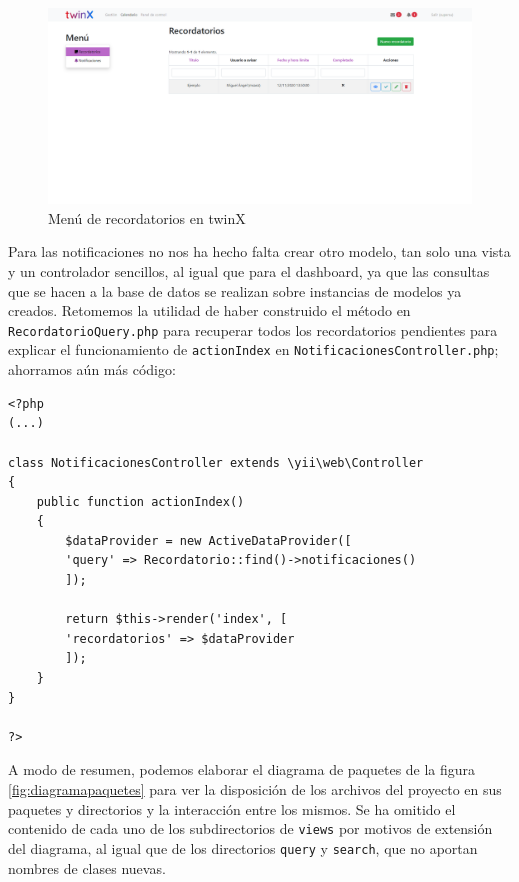 \begin{figure}
	\centering
	\includegraphics[width=\linewidth]{img/Capturas de twinX/recordatorios}
	\caption{Menú de recordatorios en twinX}
	\label{fig:recordatoriostwinX}
\end{figure}

Para las notificaciones no nos ha hecho falta crear otro modelo, tan solo una vista y un controlador sencillos, al igual que para el dashboard, ya que las consultas que se hacen a la base de datos se realizan sobre instancias de modelos ya creados. Retomemos la utilidad de haber construido el método en \texttt{RecordatorioQuery.php} para recuperar todos los recordatorios pendientes para explicar el funcionamiento de \texttt{actionIndex} en \texttt{NotificacionesController.php}; ahorramos aún más código:

\begin{verbatim}
<?php
(...)

class NotificacionesController extends \yii\web\Controller
{
	public function actionIndex()
	{
		$dataProvider = new ActiveDataProvider([
		'query' => Recordatorio::find()->notificaciones()
		]);
		
		return $this->render('index', [
		'recordatorios' => $dataProvider
		]);
	}
}

?>

\end{verbatim}

A modo de resumen, podemos elaborar el diagrama de paquetes de la figura \ref{fig:diagramapaquetes} para ver la disposición de los archivos del proyecto en sus paquetes y directorios y la interacción entre los mismos. Se ha omitido el contenido de cada uno de los subdirectorios de \texttt{views} por motivos de extensión del diagrama, al igual que de los directorios \texttt{query} y \texttt{search}, que no aportan nombres de clases nuevas.

